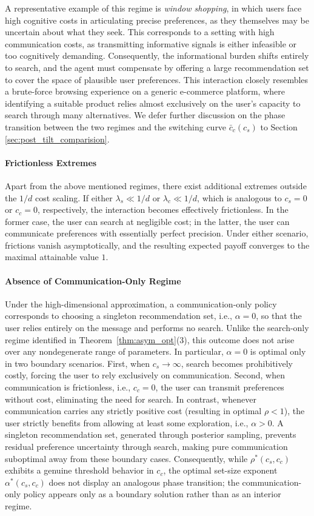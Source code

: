 \documentclass[12pt]{article}
\theoremstyle{definition}
\theoremstyle{remark}
\begin{document}
A representative example of this regime is \textit{window shopping}, in which users face high cognitive costs in articulating precise preferences, as they themselves may be uncertain about what they seek. This corresponds to a setting with high communication costs, as transmitting informative signals is either infeasible or too cognitively demanding. Consequently, the informational burden shifts entirely to search, and the agent must compensate by offering a large recommendation set to cover the space of plausible user preferences. This interaction closely resembles a brute-force browsing experience on a generic e-commerce platform, where identifying a suitable product relies almost exclusively on the user’s capacity to search through many alternatives. We defer further discussion on the phase transition between the two regimes and the switching curve $\bar c_c(c_s)$ to Section \ref{sec:post_tilt_comparision}.

\paragraph{Frictionless Extremes}
Apart from the above mentioned regimes, there exist additional extremes outside the $1/d$ cost scaling. If either $\lambda_s \ll 1/d$ or $\lambda_c \ll 1/d$, which is analogous to $c_s=0$ or $c_c=0$, respectively, the interaction becomes effectively frictionless. In the former case, the user can search at negligible cost; in the latter, the user can communicate preferences with essentially perfect precision. Under either scenario, frictions vanish asymptotically, and the resulting expected payoff converges to the maximal attainable value $1$.

\paragraph{Absence of Communication-Only Regime} Under the high-dimensional approximation, a communication-only policy corresponds to choosing a singleton recommendation set, i.e., $\alpha = 0$, so that the user relies entirely on the message and performs no search. Unlike the search-only regime identified in   Theorem~\ref{thm:asym_opt}(3), this outcome does not arise over any nondegenerate range of parameters. In particular, $\alpha = 0$ is optimal only in two boundary scenarios. First, when $c_s \rightarrow \infty$, search becomes prohibitively costly, forcing the user to rely exclusively on communication. Second, when communication is frictionless, i.e., $c_c = 0$, the user can transmit preferences without cost, eliminating the need for search. In contrast, whenever communication carries any strictly positive cost (resulting in optimal $\rho <1$), the user strictly benefits from allowing at least some exploration, i.e., $\alpha > 0$. A singleton recommendation set, generated through posterior sampling, prevents residual preference uncertainty through search, making pure communication suboptimal away from these boundary cases.
Consequently, while $\rho^*(c_s, c_c)$ exhibits a genuine threshold behavior in $c_c$, the optimal set-size exponent $\alpha^*(c_s, c_c)$ does not display an analogous phase transition; the communication-only policy appears only as a boundary solution rather than as an interior regime.
\end{document}
